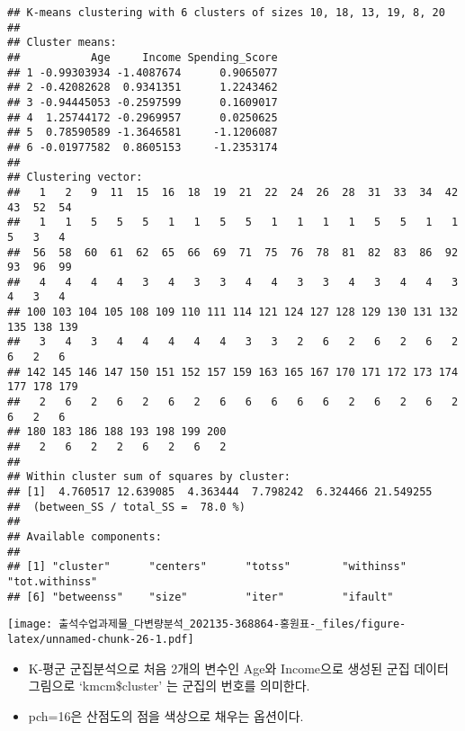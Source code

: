 \documentclass[
]{article}
\newenvironment{Shaded}{\begin{snugshade}}{\end{snugshade}}
\newcommand{\AttributeTok}[1]{\textcolor[rgb]{0.77,0.63,0.00}{#1}}
\newcommand{\CommentTok}[1]{\textcolor[rgb]{0.56,0.35,0.01}{\textit{#1}}}
\newcommand{\DecValTok}[1]{\textcolor[rgb]{0.00,0.00,0.81}{#1}}
\newcommand{\FunctionTok}[1]{\textcolor[rgb]{0.00,0.00,0.00}{#1}}
\newcommand{\NormalTok}[1]{#1}
\newcommand{\SpecialCharTok}[1]{\textcolor[rgb]{0.00,0.00,0.00}{#1}}
\providecommand{\tightlist}{%
  \setlength{\itemsep}{0pt}\setlength{\parskip}{0pt}}
\begin{document}
\begin{verbatim}
## K-means clustering with 6 clusters of sizes 10, 18, 13, 19, 8, 20
## 
## Cluster means:
##           Age     Income Spending_Score
## 1 -0.99303934 -1.4087674      0.9065077
## 2 -0.42082628  0.9341351      1.2243462
## 3 -0.94445053 -0.2597599      0.1609017
## 4  1.25744172 -0.2969957      0.0250625
## 5  0.78590589 -1.3646581     -1.1206087
## 6 -0.01977582  0.8605153     -1.2353174
## 
## Clustering vector:
##   1   2   9  11  15  16  18  19  21  22  24  26  28  31  33  34  42  43  52  54 
##   1   1   5   5   5   1   1   5   5   1   1   1   1   5   5   1   1   5   3   4 
##  56  58  60  61  62  65  66  69  71  75  76  78  81  82  83  86  92  93  96  99 
##   4   4   4   4   3   4   3   3   4   4   3   3   4   3   4   4   3   4   3   4 
## 100 103 104 105 108 109 110 111 114 121 124 127 128 129 130 131 132 135 138 139 
##   3   4   3   4   4   4   4   4   3   3   2   6   2   6   2   6   2   6   2   6 
## 142 145 146 147 150 151 152 157 159 163 165 167 170 171 172 173 174 177 178 179 
##   2   6   2   6   2   6   2   6   6   6   6   6   2   6   2   6   2   6   2   6 
## 180 183 186 188 193 198 199 200 
##   2   6   2   2   6   2   6   2 
## 
## Within cluster sum of squares by cluster:
## [1]  4.760517 12.639085  4.363444  7.798242  6.324466 21.549255
##  (between_SS / total_SS =  78.0 %)
## 
## Available components:
## 
## [1] "cluster"      "centers"      "totss"        "withinss"     "tot.withinss"
## [6] "betweenss"    "size"         "iter"         "ifault"
\end{verbatim}

\begin{Shaded}
\end{Shaded}

\texttt{[image: 출석수업과제물\_다변량분석\_202135-368864-홍원표-\_files/figure-latex/unnamed-chunk-26-1.pdf]}

\begin{itemize}
\tightlist
\item
  K-평군 군집분석으로 처음 2개의 변수인 Age와 Income으로 생성된 군집
  데이터 그림으로 `kmcm\$cluster' 는 군집의 번호를 의미한다.
\item
  pch=16은 산점도의 점을 색상으로 채우는 옵션이다.
\end{itemize}
\end{document}
